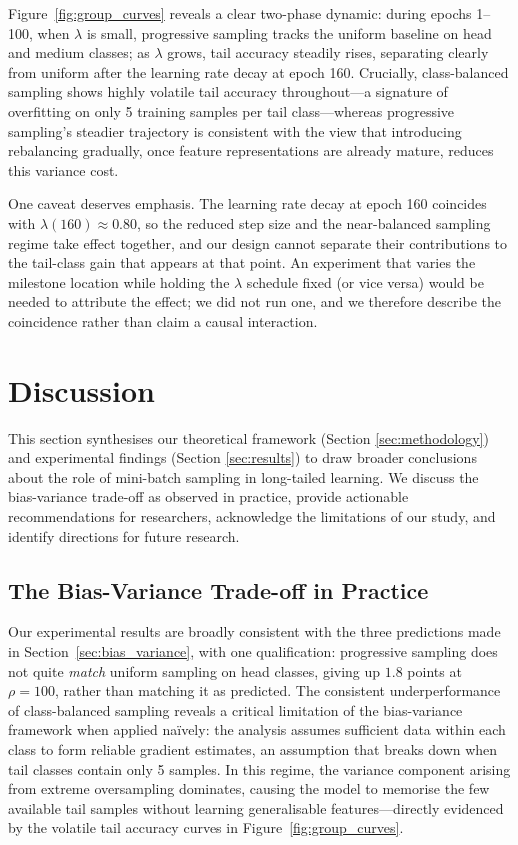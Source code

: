 \documentclass[12pt,a4paper]{article}
\begin{document}
Figure~\ref{fig:group_curves} reveals a clear two-phase dynamic: during epochs 1--100, when $\lambda$ is small, progressive sampling tracks the uniform baseline on head and medium classes; as $\lambda$ grows, tail accuracy steadily rises, separating clearly from uniform after the learning rate decay at epoch 160. Crucially, class-balanced sampling shows highly volatile tail accuracy throughout---a signature of overfitting on only 5 training samples per tail class---whereas progressive sampling's steadier trajectory is consistent with the view that introducing rebalancing gradually, once feature representations are already mature, reduces this variance cost.

One caveat deserves emphasis. The learning rate decay at epoch 160 coincides with $\lambda(160) \approx 0.80$, so the reduced step size and the near-balanced sampling regime take effect together, and our design cannot separate their contributions to the tail-class gain that appears at that point. An experiment that varies the milestone location while holding the $\lambda$ schedule fixed (or vice versa) would be needed to attribute the effect; we did not run one, and we therefore describe the coincidence rather than claim a causal interaction.

\section{Discussion}
\label{sec:discussion}
This section synthesises our theoretical framework (Section \ref{sec:methodology}) and experimental findings (Section \ref{sec:results}) to draw broader conclusions about the role of mini-batch sampling in long-tailed learning. We discuss the bias-variance trade-off as observed in practice, provide actionable recommendations for researchers, acknowledge the limitations of our study, and identify directions for future research.

\subsection{The Bias-Variance Trade-off in Practice}

Our experimental results are broadly consistent with the three predictions made in Section~\ref{sec:bias_variance}, with one qualification: progressive sampling does not quite \emph{match} uniform sampling on head classes, giving up $1.8$ points at $\rho = 100$, rather than matching it as predicted. The consistent underperformance of class-balanced sampling reveals a critical limitation of the bias-variance framework when applied na\"ively: the analysis assumes sufficient data within each class to form reliable gradient estimates, an assumption that breaks down when tail classes contain only 5 samples. In this regime, the variance component arising from extreme oversampling dominates, causing the model to memorise the few available tail samples without learning generalisable features---directly evidenced by the volatile tail accuracy curves in Figure~\ref{fig:group_curves}.
\end{document}
